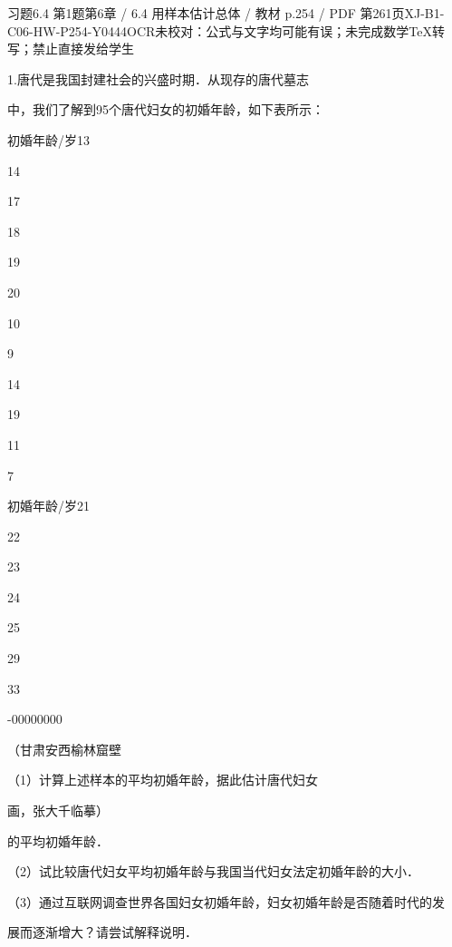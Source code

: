 \begin{bankitem}{习题6.4 第1题}{第6章 / 6.4 用样本估计总体 / 教材 p.254 / PDF 第261页}{XJ-B1-C06-HW-P254-Y0444}{OCR未校对：公式与文字均可能有误；未完成数学TeX转写；禁止直接发给学生}
\begin{ocrdraft}
\par
1.唐代是我国封建社会的兴盛时期．从现存的唐代墓志
\par
中，我们了解到95个唐代妇女的初婚年龄，如下表所示：
\par
初婚年龄/岁13
\par
14
\par
17
\par
18
\par
19
\par
20
\par
10
\par
9
\par
14
\par
19
\par
11
\par
7
\par
初婚年龄/岁21
\par
22
\par
23
\par
24
\par
25
\par
29
\par
33
\par
-00000000
\par
（甘肃安西榆林窟壁
\par
（1）计算上述样本的平均初婚年龄，据此估计唐代妇女
\par
画，张大千临摹）
\par
的平均初婚年龄．
\par
（2）试比较唐代妇女平均初婚年龄与我国当代妇女法定初婚年龄的大小．
\par
（3）通过互联网调查世界各国妇女初婚年龄，妇女初婚年龄是否随着时代的发
\par
展而逐渐增大？请尝试解释说明．
\end{ocrdraft}
\end{bankitem}

